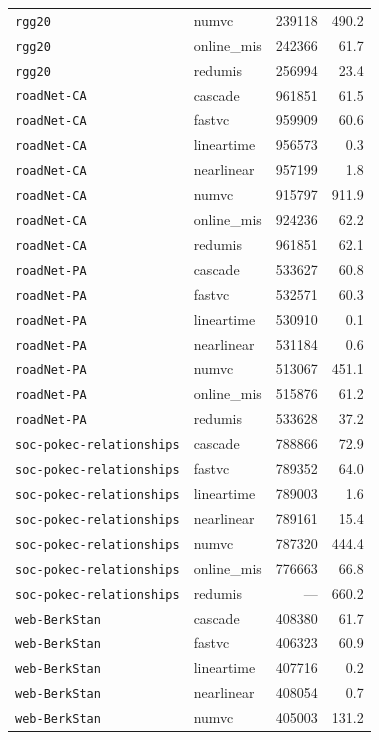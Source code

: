 \begin{longtable}{l l r r}
\texttt{rgg20} & numvc & 239118 & 490.2 \\
\texttt{rgg20} & online\_mis & 242366 & 61.7 \\
\texttt{rgg20} & redumis & 256994 & 23.4 \\
\texttt{roadNet-CA} & cascade & 961851 & 61.5 \\
\texttt{roadNet-CA} & fastvc & 959909 & 60.6 \\
\texttt{roadNet-CA} & lineartime & 956573 & 0.3 \\
\texttt{roadNet-CA} & nearlinear & 957199 & 1.8 \\
\texttt{roadNet-CA} & numvc & 915797 & 911.9 \\
\texttt{roadNet-CA} & online\_mis & 924236 & 62.2 \\
\texttt{roadNet-CA} & redumis & 961851 & 62.1 \\
\texttt{roadNet-PA} & cascade & 533627 & 60.8 \\
\texttt{roadNet-PA} & fastvc & 532571 & 60.3 \\
\texttt{roadNet-PA} & lineartime & 530910 & 0.1 \\
\texttt{roadNet-PA} & nearlinear & 531184 & 0.6 \\
\texttt{roadNet-PA} & numvc & 513067 & 451.1 \\
\texttt{roadNet-PA} & online\_mis & 515876 & 61.2 \\
\texttt{roadNet-PA} & redumis & 533628 & 37.2 \\
\texttt{soc-pokec-relationships} & cascade & 788866 & 72.9 \\
\texttt{soc-pokec-relationships} & fastvc & 789352 & 64.0 \\
\texttt{soc-pokec-relationships} & lineartime & 789003 & 1.6 \\
\texttt{soc-pokec-relationships} & nearlinear & 789161 & 15.4 \\
\texttt{soc-pokec-relationships} & numvc & 787320 & 444.4 \\
\texttt{soc-pokec-relationships} & online\_mis & 776663 & 66.8 \\
\texttt{soc-pokec-relationships} & redumis & --- & 660.2 \\
\texttt{web-BerkStan} & cascade & 408380 & 61.7 \\
\texttt{web-BerkStan} & fastvc & 406323 & 60.9 \\
\texttt{web-BerkStan} & lineartime & 407716 & 0.2 \\
\texttt{web-BerkStan} & nearlinear & 408054 & 0.7 \\
\texttt{web-BerkStan} & numvc & 405003 & 131.2 \\

\end{longtable}
